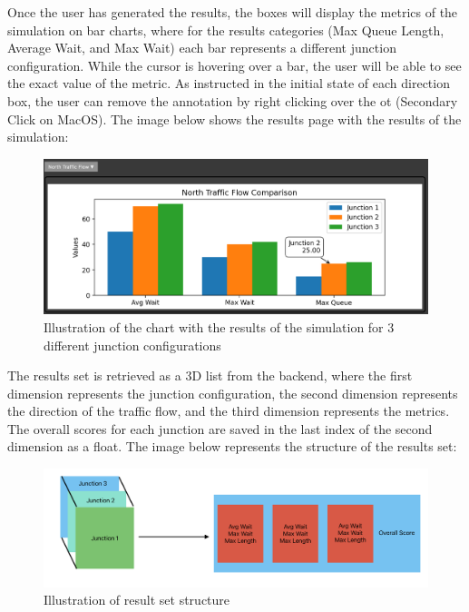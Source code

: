 \documentclass{article}
\begin{document}
    Once the user has generated the results, the boxes will display the metrics of the simulation on bar charts, where for the results categories (Max Queue Length, Average Wait, and Max Wait)
    each bar represents a different junction configuration. While the cursor is hovering over a bar, the user will be able to see the exact value of the metric. As instructed in the initial state
    of each direction box, the user can remove the annotation by right clicking over the ot (Secondary Click on MacOS). The image below shows the results page with the results of the simulation:

    \begin{figure}[H]
        \centering
        \includegraphics[width=\textwidth]{results2}
        \caption{Illustration of the chart with the results of the simulation for 3 different junction configurations}
        \label{fig:results2}
    \end{figure}

    The results set is retrieved as a 3D list from the backend, where the first dimension represents the junction configuration, the second dimension represents the direction of the traffic flow, and the third dimension represents the metrics. The overall scores
    for each junction are saved in the last index of the second dimension as a float.
    The image below represents the structure of the results set:

    \begin{figure}[H]
        \centering
        \includegraphics[width=\textwidth]{results3d}
        \caption{Illustration of result set structure}
        \label{fig:results3d}
    \end{figure}
\end{document}

